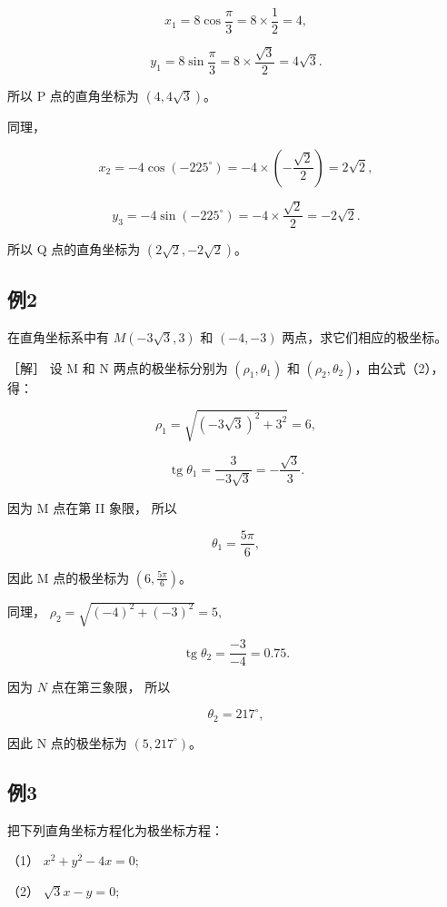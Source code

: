 \[
x_{1} = 8 \cos \frac {\pi}{3} = 8 \times \frac {1}{2} = 4,
\]

\[
y_{1} = 8 \sin \frac {\pi}{3} = 8 \times \frac {\sqrt {3}}{2} = 4 \sqrt {3}.
\]

所以 P 点的直角坐标为 \((4, 4\sqrt{3})\)。

同理，

\[
x_{2} = - 4 \cos (- 225^{\circ}) = - 4 \times \left(- \frac {\sqrt {2}}{2}\right) = 2 \sqrt {2},
\]

\[
y_{3} = - 4 \sin (- 225^{\circ}) = - 4 \times \frac {\sqrt {2}}{2} = - 2 \sqrt {2}.
\]

所以 Q 点的直角坐标为 \((2\sqrt{2}, -2\sqrt{2})\)。

\subsection{例2}\label{ux4f8b2-45}

在直角坐标系中有 \(M(-3\sqrt{3}, 3)\) 和 \((-4, -3)\)
两点，求它们相应的极坐标。

［解］ 设 M 和 N 两点的极坐标分别为 \((\rho_{1}, \theta_{1})\) 和
\((\rho_{2}, \theta_{2})\)，由公式（2），得：

\[
\rho_{1} = \sqrt {(- 3 \sqrt {3}) ^ {2} + 3^{2}} = 6,
\]

\[
\operatorname{tg} \theta_{1} = \frac {3}{- 3 \sqrt {3}} = - \frac {\sqrt {3}}{3}.
\]

因为 M 点在第 II 象限， 所以

\[
\theta_{1} = \frac {5 \pi}{6},
\]

因此 M 点的极坐标为 \(\left(6, \frac{5\pi}{6}\right)\)。

同理， \(\rho_{2} = \sqrt{(-4)^{2} + (-3)^{2}} = 5,\)

\[
\operatorname{tg} \theta_{2} = \frac {- 3}{- 4} = 0. 75.
\]

因为 \(N\) 点在第三象限， 所以

\[
\theta_{2} = 217^{\circ},
\]

因此 N 点的极坐标为 \((5, 217^{\circ})\)。

\subsection{例3}\label{ux4f8b3-32}

把下列直角坐标方程化为极坐标方程：

（1） \(x^{2} + y^{2} - 4x = 0;\)

（2） \(\sqrt{3} x - y = 0;\)

